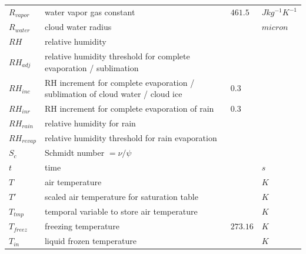 \documentclass[letterpaper,titlepage,10pt]{article}
\numberwithin{equation}{section}
\begin{document}
\begin{appendices}
\begin{longtable}{p{}p{}p{}p{}}
	$R_{vapor}$        & water vapor gas constant                                                             & $461.5$                    & $J kg^{-1} K^{-1}$ \\
	$R_{water}$        & cloud water radius                                                                   &                            & $micron$ \\
	$RH$               & relative humidity                                                                    &                            & \\
	$RH_{adj}$         & relative humidity threshold for complete evaporation / sublimation                   &                            & \\
	$RH_{inc}$         & RH increment for complete evaporation / sublimation of cloud water / cloud ice       & $0.3$                      & \\
	$RH_{inr}$         & RH increment for complete evaporation of rain                                        & $0.3$                      & \\
	$RH_{rain}$        & relative humidity for rain                                                           &                            & \\
	$RH_{revap}$       & relative humidity threshold for rain evaporation                                     &                            & \\
	$S_c$              & Schmidt number $= \nu / \psi$                                                        &                            & \\
	$t$                & time                                                                                 &                            & $s$ \\
	$T$                & air temperature                                                                      &                            & $K$ \\
	$T'$               & scaled air temperature for saturation table                                          &                            & $K$ \\
	$T_{tmp}$          & temporal variable to store air temperature                                           &                            & $K$ \\
	$T_{freez}$        & freezing temperature                                                                 & $273.16$                   & $K$ \\
	$T_{in}$           & liquid frozen temperature                                                            &                            & $K$ \\

\end{longtable}
\end{appendices}
\end{document}
